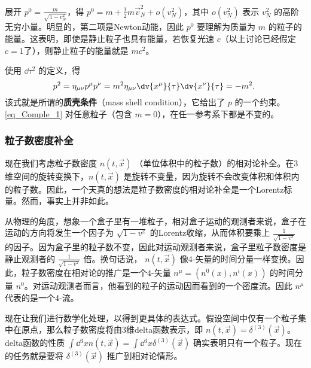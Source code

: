 展开 $p^0=\frac{m}{\sqrt{1-v_N^2}}$，得 $p^0=m+\frac{1}{2}m\vec v_N^2+o(v_N^2)$，其中 $o(v_N^2)$ 表示 $v_N^2$ 的高阶无穷小量。明显的，第二项是Newton动能，因此 $p^0$ 要理解为质量为 $m$ 的粒子的能量。这表明，即使是静止粒子也具有能量，若恢复光速 $c$（以上讨论已经假定 $c=1$了），则静止粒子的能量就是 $mc^2$。

使用 $\dd\tau^2$ 的定义，得
\begin{equation}\label{eq_Comple_1}
p^2=\eta_{\mu\nu}p^\mu p^\nu=m^2\eta_{\mu\nu}\dv{x^\mu}{\tau}\dv{x^\nu}{\tau}=-m^2.~
\end{equation}
该式就是所谓的\textbf{质壳条件}（mass shell condition），它给出了 $p$ 的一个约束。\autoref{eq_Comple_1} 对任意粒子（包含 $m=0$），在任一参考系下都是不变的。


\subsubsection{粒子数密度补全}

现在我们考虑粒子数密度 $n(t,\vec x)$ （单位体积中的粒子数）的相对论补全。在3维空间的旋转变换下，$n(t,\vec x)$ 是旋转不变量，因为旋转不会改变体积和体积内的粒子数。因此，一个天真的想法是粒子数密度的相对论补全是一个Lorentz标量。然而，事实上并非如此。

从物理的角度，想象一个盒子里有一堆粒子，相对盒子运动的观测者来说，盒子在运动的方向将发生一个因子为 $\sqrt{1-v^2}$ 的Lorentz收缩，从而体积要乘上 $\frac{1}{\sqrt{1-v^2}}$ 的因子。因为盒子里的粒子数不变，因此对运动观测者来说，盒子里粒子数密度是静止观测者的 $\frac{1}{\sqrt{1-v^2}}$ 倍。换句话说， $n(t,\vec x)$ 像4-矢量的时间分量一样变换。因此，粒子数密度在相对论的推广是一个4-矢量 $n^\mu=(n^0(x),n^i(x))$ 的时间分量 $n^0$。对运动观测者而言，他看到的粒子的运动因而看到的一个密度流。因此 $n^\mu$ 代表的是一个4-流。

现在让我们进行数学化处理，以得到更具体的表达式。假设空间中仅有一个粒子集中在原点，那么粒子数密度将由3维delta函数表示，即 $n(t,\vec x)=\delta^{(3)}(\vec x)$。delta函数的性质 $\int\dd{^3} xn(t,\vec x)=\int\dd{^3} x\delta^{(3)}(\vec x)$ 确实表明只有一个粒子。现在的任务就是要将 $\delta^{(3)}(\vec x)$ 推广到相对论情形。

